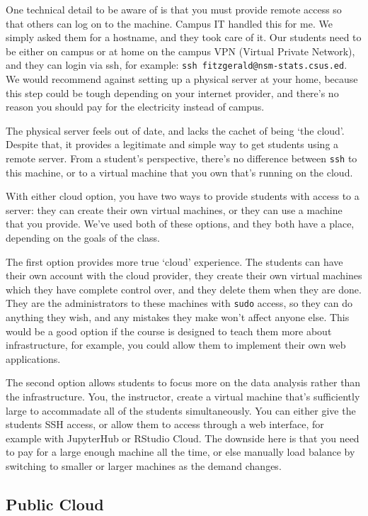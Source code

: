 \documentclass[12pt]{article}
\begin{document}
One technical detail to be aware of is that you must provide remote access so that others can log on to the machine.
Campus IT handled this for me.
We simply asked them for a hostname, and they took care of it.
Our students need to be either on campus or at home on the campus VPN (Virtual Private Network), and they can login via ssh, for example: \texttt{ssh fitzgerald@nsm-stats.csus.ed}.
We would recommend against setting up a physical server at your home, because this step could be tough depending on your internet provider, and there's no reason you should pay for the electricity instead of campus.

The physical server feels out of date, and lacks the cachet of being `the cloud'.
Despite that, it provides a legitimate and simple way to get students using a remote server.
From a student's perspective, there's no difference between \texttt{ssh} to this machine, or to a virtual machine that you own that's running on the cloud.

With either cloud option, you have two ways to provide students with access to a server: they can create their own virtual machines, or they can use a machine that you provide.
We've used both of these options, and they both have a place, depending on the goals of the class.

The first option provides more true `cloud' experience.
The students can have their own account with the cloud provider, they create their own virtual machines which they have complete control over, and they delete them when they are done.
They are the administrators to these machines with \texttt{sudo} access, so they can do anything they wish, and any mistakes they make won't affect anyone else.
This would be a good option if the course is designed to teach them more about infrastructure, for example, you could allow them to implement their own web applications.

The second option allows students to focus more on the data analysis rather than the infrastructure.
You, the instructor, create a virtual machine that's sufficiently large to accommadate all of the students simultaneously.
You can either give the students SSH access, or allow them to access through a web interface, for example with JupyterHub or RStudio Cloud.
The downside here is that you need to pay for a large enough machine all the time, or else manually load balance by switching to smaller or larger machines as the demand changes.



\subsection{Public Cloud}
\end{document}
